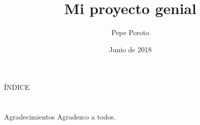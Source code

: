 \documentclass[handout,t]{beamer}
\title[Mi proyecto genial]{
	Mi proyecto genial}
\date{Junio de 2018}
\author[Pepe Poroto]{
	Pepe Poroto}
\institute[FIUBA]{
	\url{pporoto@gmail.com}\\
	\vspace{0.25cm}
	Facultad de Ingeniería\\
	Universidad de Buenos Aires}
\begin{document}
\frame{\titlepage}
\section[]{}
\begin{frame}{ÍNDICE}
	\tableofcontents
\end{frame}











\section{}
\begin{frame}{Agradecimientos}
	Agradezco a todos.
\end{frame}
\end{document}
